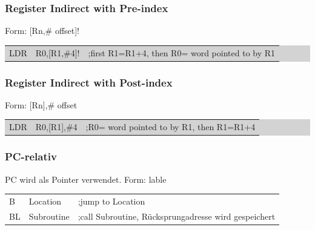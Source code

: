 \subsubsection{Register Indirect with Pre-index}
Form: [Rn,\# offset]!\newline
\colorbox{lightgray}{
\begin{tabular}{lll}
   LDR & R0,[R1,\#4]! &;first R1=R1+4, then R0= word pointed to by R1  \\ 
\end{tabular} }

\subsubsection{Register Indirect with Post-index}
Form: [Rn],\# offset\newline
\colorbox{lightgray}{
\begin{tabular}{lll}
    LDR& R0,[R1],\#4  &;R0= word pointed to by R1, then R1=R1+4  \\ 
\end{tabular} }

\subsubsection{PC-relativ}
PC wird als Pointer verwendet.
Form: lable\newline
\begin{tabular}{lll}
    B   &Location   &;jump to Location\\ 
    BL  &Subroutine &;call Subroutine, Rücksprungadresse wird gespeichert\\ 
\end{tabular} 

